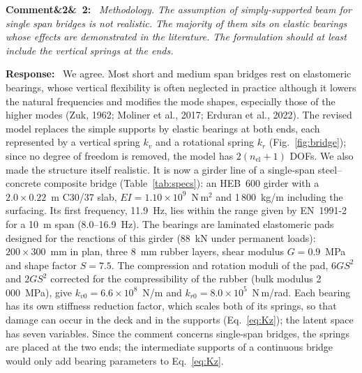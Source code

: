 \documentclass[11pt]{article}
\newenvironment{rcomment}[1]{\par\bigskip\noindent\textbf{Comment\ifx&#1&\else\ #1\fi:}\ \itshape}{\par}
\newenvironment{response}{\par\smallskip\noindent\color{resp}\textbf{Response:}\ }{\par}
\begin{document}
\begin{rcomment}{2}
Methodology. The assumption of simply-supported beam for single span bridges is not realistic. The majority of them
sits on elastic bearings whose effects are demonstrated in the literature. The formulation should at least include the
vertical springs at the ends.
\end{rcomment}

\begin{response}
We agree. Most short and medium span bridges rest on elastomeric bearings, whose vertical flexibility is often neglected
in practice although it lowers the natural frequencies and modifies the mode shapes, especially those of the higher
modes (Zuk, 1962; Moliner et al., 2017; Erduran et al., 2022). The revised model replaces the simple supports by elastic
bearings at both ends, each represented by a
vertical spring $k_v$ and a rotational spring $k_r$ (Fig.~\ref{fig:bridge}); since no degree of freedom is removed, the
model has $2(n_{\mathrm{el}}+1)$ DOFs. We also made the structure itself realistic. It is now a girder line of a
single-span steel--concrete composite bridge (Table~\ref{tab:specs}): an HEB~600 girder with a $2.0\times0.22$~m C30/37
slab, $EI=1.10\times10^{9}$~N\,m$^2$ and 1\,800~kg/m including the surfacing. Its first frequency, 11.9~Hz, lies within
the range given by EN~1991-2 for a 10~m span (8.0--16.9~Hz). The bearings are laminated elastomeric pads designed for the
reactions of this girder (88~kN under permanent loads): $200\times300$~mm in plan, three 8~mm rubber layers, shear
modulus $G=0.9$~MPa and shape factor $S=7.5$. The compression and rotation moduli of the pad, $6GS^2$ and $2GS^2$
corrected for the compressibility of the rubber (bulk modulus 2\,000~MPa), give $k_{v0}=6.6\times10^{8}$~N/m and
$k_{r0}=8.0\times10^{5}$~N\,m/rad. Each bearing has its own stiffness reduction factor, which scales both of its springs,
so that damage can occur in the deck and in the supports (Eq.~\eqref{eq:Kz}); the latent space has seven variables.
Since the comment concerns single-span bridges, the springs are placed at the two ends; the intermediate supports of a
continuous bridge would only add bearing parameters to Eq.~\eqref{eq:Kz}.


\end{response}
\end{document}
